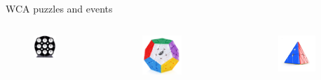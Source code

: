 \documentclass[10pt]{beamer}
\begin{document}
\begin{frame}{WCA puzzles and events}
\begin{columns}[c]
                            \begin{figure}
                                \includegraphics[width=0.6\textwidth]{assets/clock.jpg} \pause{}
                            \end{figure}

                            \begin{figure}
                                \includegraphics[width=0.6\textwidth]{assets/mega.jpg} \pause{}
                            \end{figure}

                            \begin{figure}
                                \includegraphics[width=0.7\textwidth]{assets/pyra.jpg} \pause{}
                            \end{figure}


\end{columns}
\end{frame}
\end{document}
